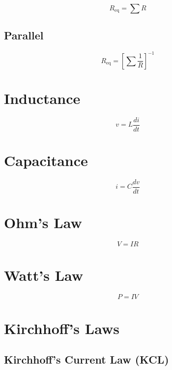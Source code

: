 \documentclass{article}
\begin{document}
    \begin{equation}
        R_\text{eq} = \sum{R}
    \end{equation}

    \subsection{Parallel}

    \begin{equation}
        R_\text{eq} = \left[\sum{\frac{1}{R}}\right]^{-1}
    \end{equation}

    \section{Inductance}

    \begin{equation}
        v = L\frac{di}{dt}
    \end{equation}

    \section{Capacitance}

    \begin{equation}
        i = C\frac{dv}{dt}
    \end{equation}

    \section{Ohm's Law}

    \begin{equation}
        V = IR
    \end{equation}

    \section{Watt's Law}

    \begin{equation}
        P = IV
    \end{equation}

    \section{Kirchhoff's Laws}

    \subsection{Kirchhoff's Current Law (KCL)}
\end{document}
